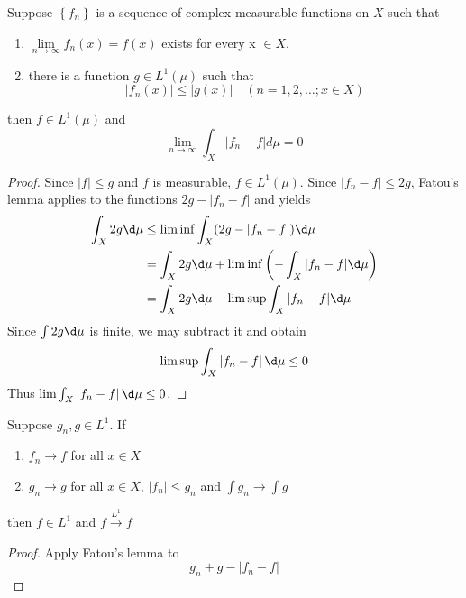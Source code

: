 \documentclass[12pt, a4paper, oneside]{book}
\begin{document}
\begin{theorem}
    Suppose $\left\{f_n\right\}$ is a sequence of complex measurable functions on $X$ such that
    \begin{enumerate}[label=(\roman*)]
        \item
              $\lim\limits_{n\to\infty}f_{n}(x)=f(x)$ exists for every x $\in X$. \\
        \item
              there is a function $g\in L^{1}(\mu)$ such that
              $$\left|f_{n}(x)\right| \leq \left|g(x)\right| \quad(n=1,2,\ldots;x\in X)$$
    \end{enumerate}
    then $f\in L^1(\mu)$ and
    \begin{equation*}
        \lim_{n\to\infty}\int_X\left|f_n-f\right| d\mu=0
    \end{equation*}
    \begin{proof}
        Since $|f|\leq g$ and $f$ is measurable, $f\in L^1(\mu).$ Since $|f_n-f|\leq2g$, Fatou's lemma applies to the functions $2g-|f_n-f|$ and yields
        $$\begin{aligned}
                \int_{X}2g\d \mu & \leq\lim\inf\int_{X}(2g-|f_{n}-f|)\d \mu                        \\
                                 & =\int_{X}2g\d \mu+\lim\inf\left(-\int_{X}|f_{n}-f|\d \mu\right) \\
                                 & =\int_{X}2g\d \mu-\lim\sup\int_{X}|f_{n}-f|\d \mu
            \end{aligned}$$
        Since $\int 2g\d \mu$ is finite, we may subtract it and obtain
        \begin{equation*}
            \lim\sup\int_X\left|f_{n}-f\right|\d \mu\leq 0
        \end{equation*}
        Thus $\lim\int_X\left|f_{n}-f\right|\d \mu\leq 0$.
    \end{proof}
\end{theorem}

\begin{theorem}
    Suppose $g_n,g \in L^1$. If
    \begin{enumerate}[label=(\roman*)]
        \item
              $ f_n \rightarrow f$ for all $x\in X$
        \item
              $g_n \rightarrow g$ for all $x\in X$,  $\left|f_n\right| \leq g_n$ and $\int g_n \rightarrow \int g$
    \end{enumerate}
    then $f \in L^1$ and $f \xrightarrow{L^1}f$
    \begin{proof}
        Apply Fatou's lemma to
        \begin{equation*}
            g_n+g -\left|f_n-f\right|
        \end{equation*}
    \end{proof}
\end{theorem}
\end{document}
